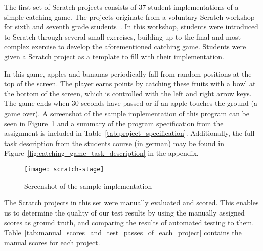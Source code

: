 The first set of Scratch projects consists of 37 student implementations of a simple catching game.
The projects originate from a voluntary Scratch workshop for sixth and seventh grade students~\cite{keller}.
In this workshop, students were introduced to Scratch through several small exercises,
building up to the final and most complex exercise to develop the aforementioned catching game.
Students were given a Scratch project as a template to fill with their implementation.
\parspace

In this game, apples and bananas periodically fall from random positions at the top of the screen.
The player earns points by catching these fruits with a bowl at the bottom of the screen,
which is controlled with the left and right arrow keys.
The game ends when 30 seconds have passed or if an apple touches the ground (a game over).
A screenshot of the sample implementation of this program can be seen in Figure~\ref{fig:screenshot_of_the_sample_implementation}
and a summary of the program specification from the assignment is included in Table~\ref{tab:project_specification}.
Additionally, the full task description from the students course (in german) may be found in Figure~\ref{fig:catching_game_task_description} in the appendix.
\parspace

\begin{figure}[htpb]
    \centering
    \texttt{[image: scratch-stage]}
    \caption{Screenshot of the sample implementation}
    \label{fig:screenshot_of_the_sample_implementation}
\end{figure}

The Scratch projects in this set were manually evaluated and scored.
This enables us to determine the quality of our test results by using the manually assigned scores as ground truth,
and comparing the results of automated testing to them.
Table~\ref{tab:manual_scores_and_test_passes_of_each_project} contains the manual scores for each project.
\parspace

